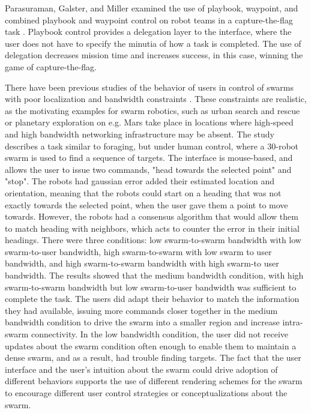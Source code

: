 Parasuraman, Galster, and Miller examined the use of playbook, waypoint, and combined playbook and waypoint control on robot teams in a capture-the-flag task \citep{parasuraman2005flexible}.
Playbook control provides a delegation layer to the interface, where the user does not have to specify the minutia of how a task is completed. 
The use of delegation decreases mission time and increases success, in this case, winning the game of capture-the-flag.

There have been previous studies of the behavior of users in control of swarms with poor localization and bandwidth constraints \citep{nunnally2012human}. 
These constraints are realistic, as the motivating examples for swarm robotics, such as urban search and rescue or planetary exploration on e.g. Mars take place in locations where high-speed and high bandwidth networking infrastructure may be absent. 
The study describes a task similar to foraging, but under human control, where a 30-robot swarm is used to find a sequence of targets. 
The interface is mouse-based, and allows the user to issue two commands, "head towards the selected point" and "stop". 
The robots had gaussian error added their estimated location and orientation, meaning that the robots could start on a heading that was not exactly towards the selected point, when the user gave them a point to move towards. 
However, the robots had a consensus algorithm that would allow them to match heading with neighbors, which acts to counter the error in their initial headings. 
There were three conditions: low swarm-to-swarm bandwidth with low swarm-to-user bandwidth, high swarm-to-swarm with low swarm to user bandwidth, and high swarm-to-swarm bandwidth with high swarm-to user bandwidth.
The results showed that the medium bandwidth condition, with high swarm-to-swarm bandwidth but low swarm-to-user bandwidth was sufficient to complete the task. 
The users did adapt their behavior to match the information they had available, issuing more commands closer together in the medium bandwidth condition to drive the swarm into a smaller region and increase intra-swarm connectivity. 
In the low bandwidth condition, the user did not receive updates about the swarm condition often enough to enable them to maintain a dense swarm, and as a result, had trouble finding targets. 
The fact that the user interface and the user's intuition about the swarm could drive adoption of different behaviors supports the use of different rendering schemes for the swarm to encourage different user control strategies or conceptualizations about the swarm. 

